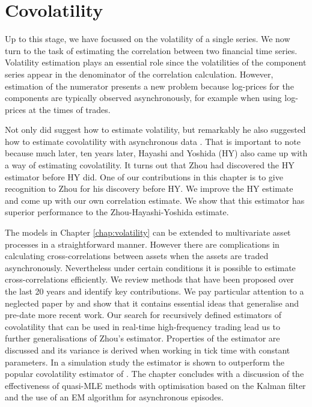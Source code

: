 \chapter{Covolatility}\label{chap:covolatility}	 		%
Up to this stage, we have focussed on the volatility of a single series. We now turn to the task of estimating the correlation between two financial time series.  Volatility estimation plays an essential role since the volatilities of the component series appear in the denominator of the correlation calculation. However, estimation of the numerator presents a new problem because log-prices for the components are typically observed asynchronously, for example when using log-prices at the times of trades.

Not only did \citet{zhou1996high} suggest
how to estimate volatility, but remarkably he also suggested how to estimate covolatility with asynchronous data \citep{zhou1998estimating}. That is
important to note because much later, ten years later, Hayashi and Yoshida (HY) also came up with
a way of estimating covolatility. It turns out that Zhou had  discovered the HY estimator 
before HY did. One of our contributions in this chapter is to give recognition to
Zhou for his discovery before HY. We improve the HY estimate and come up with our
own correlation estimate. We show that this estimator has superior performance to the
Zhou-Hayashi-Yoshida estimate.

The  models in Chapter \ref{chap:volatility} can  be extended to multivariate asset processes in a straightforward manner. However there are complications in calculating cross-correlations between assets when the assets are traded asynchronously.  Nevertheless under certain conditions it is possible to estimate cross-correlations efficiently. We review methods that have been proposed over the last 20 years and identify key contributions.  We pay particular attention to a neglected paper by \citet{zhou1998estimating} and show that it contains essential ideas that generalise and pre-date more recent work. Our search for recursively defined estimators of covolatility that can be used in real-time high-frequency trading lead us to further generalisations of Zhou's estimator. Properties of the estimator are discussed and its variance is derived when working in tick time with constant parameters. In a simulation study the estimator is shown to outperform the popular covolatility estimator of \citet{hayashi2005covariance}. The chapter concludes with a discussion of the effectiveness of quasi-MLE methods with optimisation based on the Kalman filter and the use of an EM algorithm for asynchronous episodes.    

